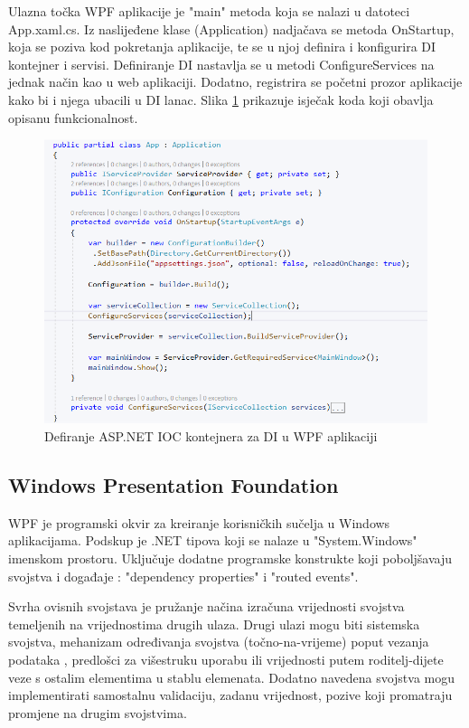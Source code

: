 \documentclass[times, utf8, diplomski]{fer}
\begin{document}
Ulazna točka WPF aplikacije je "main" metoda koja se nalazi u datoteci App.xaml.cs. Iz naslijeđene klase (Application) nadjačava se metoda OnStartup, koja se poziva kod pokretanja aplikacije, te se u njoj definira i konfigurira DI kontejner i servisi. Definiranje DI nastavlja se u metodi ConfigureServices na jednak način kao u web aplikaciji. Dodatno, registrira se početni prozor aplikacije kako bi i njega ubacili u DI lanac. Slika \ref{fig:app_DI} prikazuje isječak koda koji obavlja opisanu funkcionalnost.

\begin{figure}[htb]
\centering
\includegraphics[width=14cm]{code_app_DI.PNG}
\caption{Defiranje ASP.NET IOC kontejnera za DI u WPF aplikaciji }
\label{fig:app_DI}
\end{figure}


\subsection{Windows Presentation Foundation}
WPF je programski okvir za kreiranje korisničkih sučelja u Windows aplikacijama. Podskup je .NET tipova koji se nalaze u  "System.Windows" imenskom prostoru. Uključuje dodatne programske konstrukte koji poboljšavaju svojstva  i događaje  : "dependency properties" i "routed events".

Svrha ovisnih svojstava  je pružanje načina izračuna vrijednosti svojstva temeljenih na vrijednostima drugih ulaza. Drugi ulazi mogu biti sistemska svojstva, mehanizam određivanja svojstva (točno-na-vrijeme) poput vezanja podataka , predlošci za višestruku uporabu ili vrijednosti putem roditelj-dijete veze s ostalim elementima u stablu elemenata.
Dodatno navedena svojstva mogu implementirati samostalnu validaciju, zadanu vrijednost, pozive koji promatraju promjene na drugim svojstvima. \citep{wpf}
\end{document}
